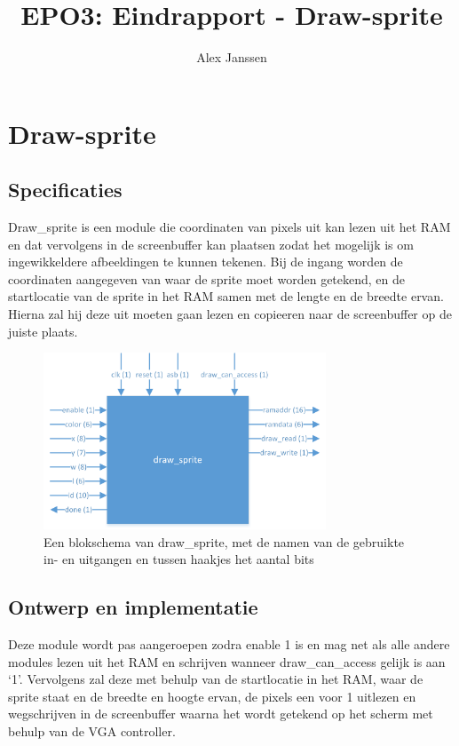 \documentclass{scrartcl} %
\author{Alex Janssen}
\title{EPO3: Eindrapport - Draw-sprite}
\begin{document}
\section{Draw-sprite}
\label{sec:draw-sprite}

\subsection{Specificaties}
Draw\_sprite is een module die coordinaten van pixels uit kan lezen uit het RAM en dat vervolgens in de screenbuffer kan plaatsen zodat het mogelijk is om ingewikkeldere afbeeldingen te kunnen tekenen. Bij de ingang worden de coordinaten aangegeven van waar de sprite moet worden getekend, en de startlocatie van de sprite in het RAM samen met de lengte en de breedte ervan. Hierna zal hij deze uit moeten gaan lezen en copieeren naar de screenbuffer op de juiste plaats.

\begin{figure}[H]
	\centering
	\includegraphics[width=0.75\textwidth]{resource/draw_sprite.png}
	\caption{Een blokschema van draw\_sprite, met de namen van de gebruikte in- en uitgangen en tussen haakjes het aantal bits}
	\label{fig:draw-sprite-schema}
\end{figure}

\subsection{Ontwerp en implementatie}
Deze module wordt pas aangeroepen zodra enable 1 is en mag net als alle andere modules lezen uit het RAM en schrijven wanneer draw\_can\_access gelijk is aan `1'. Vervolgens zal deze met behulp van de startlocatie in het RAM, waar de sprite staat en de breedte en hoogte ervan, de pixels een voor 1 uitlezen en wegschrijven in de screenbuffer waarna het wordt getekend op het scherm met behulp van de VGA controller.
\end{document}
